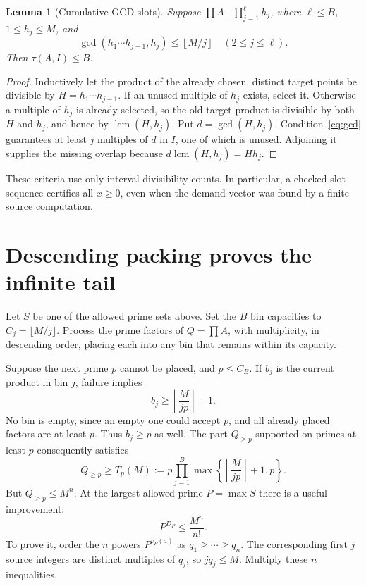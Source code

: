 \documentclass[11pt,a4paper]{article}
\newtheorem{lemma}[theorem]{Lemma}
\begin{document}
\begin{lemma}[Cumulative-GCD slots]\label{lem:gcd}
Suppose $\prod A\mid\prod_{j=1}^{\ell}h_j$, where $\ell\le B$, $1\le h_j\le M$, and
\begin{equation}\label{eq:gcd}
 \gcd(h_1\cdots h_{j-1},h_j)\le\left\lfloor M/j\right\rfloor
 \quad(2\le j\le\ell).
\end{equation}
Then $\tau(A,I)\le B$.
\end{lemma}
\begin{proof}
Inductively let the product of the already chosen, distinct target points be divisible by $H=h_1\cdots h_{j-1}$. If an unused multiple of $h_j$ exists, select it. Otherwise a multiple of $h_j$ is already selected, so the old target product is divisible by both $H$ and $h_j$, and hence by $\operatorname{lcm}(H,h_j)$. Put $d=\gcd(H,h_j)$. Condition~\eqref{eq:gcd} guarantees at least $j$ multiples of $d$ in $I$, one of which is unused. Adjoining it supplies the missing overlap because $d\operatorname{lcm}(H,h_j)=Hh_j$.
\end{proof}

These criteria use only interval divisibility counts. In particular, a checked slot sequence certifies all $x\ge0$, even when the demand vector was found by a finite source computation.

\section{Descending packing proves the infinite tail}
Let $S$ be one of the allowed prime sets above. Set the $B$ bin capacities to $C_j=\lfloor M/j\rfloor$. Process the prime factors of $Q=\prod A$, with multiplicity, in descending order, placing each into any bin that remains within its capacity.

Suppose the next prime $p$ cannot be placed, and $p\le C_B$. If $b_j$ is the current product in bin $j$, failure implies
\[
 b_j\ge \left\lfloor\frac{M}{jp}\right\rfloor+1.
\]
No bin is empty, since an empty one could accept $p$, and all already placed factors are at least $p$. Thus $b_j\ge p$ as well. The part $Q_{\ge p}$ supported on primes at least $p$ consequently satisfies
\begin{equation}\label{eq:T}
 Q_{\ge p}\ge T_p(M):=
 p\prod_{j=1}^{B}\max\left\{\left\lfloor\frac{M}{jp}\right\rfloor+1,p\right\}.
\end{equation}
But $Q_{\ge p}\le M^n$. At the largest allowed prime $P=\max S$ there is a useful improvement:
\begin{equation}\label{eq:distinct}
 P^{D_P}\le \frac{M^n}{n!}.
\end{equation}
To prove it, order the $n$ powers $P^{v_P(a)}$ as $q_1\ge\cdots\ge q_n$. The corresponding first $j$ source integers are distinct multiples of $q_j$, so $jq_j\le M$. Multiply these $n$ inequalities.
\end{document}
